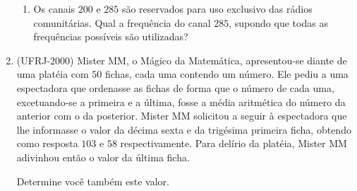 \begin{enumerate}
\begin{enumerate}
\item {} 
Os canais \(200\) e \(285\) são reservados para uso exclusivo das rádios comunitárias. Qual a frequência do canal \(285\), supondo que todas as frequências possíveis são utilizadas?

\end{enumerate}

\item (UFRJ-2000) Mister MM, o Mágico da Matemática, apresentou-se diante de uma platéia com \(50\) fichas, cada uma contendo um número. Ele pediu a uma espectadora que ordenasse as fichas de forma que o número de cada uma, excetuando-se a primeira e a última, fosse a média aritmética do número da anterior com o da posterior. Mister MM solicitou a seguir à espectadora que lhe informasse o valor da décima sexta e da trigésima primeira ficha, obtendo como resposta \(103\) e \(58\) respectivamente. Para delírio da platéia, Mister MM adivinhou então o valor da última ficha.

Determine você também este valor.

\end{enumerate}